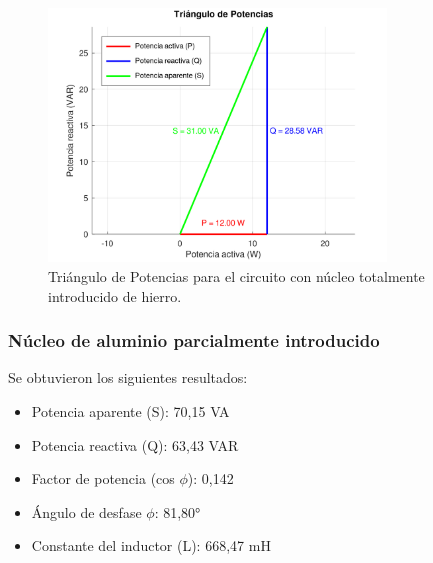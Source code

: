 \documentclass{article}
\begin{document}
                        \begin{figure}[H]
                            \centering
                            \includegraphics[width=0.8\textwidth]{graficoTotalHierro.png}
                            \caption{Triángulo de Potencias para el circuito con núcleo totalmente introducido de hierro.}
                            \label{fig:graficoTotalHierro}
                        \end{figure}


                        \subsubsection{Núcleo de aluminio parcialmente introducido}

                            Se obtuvieron los siguientes resultados:
                        \begin{itemize}
                            \item Potencia aparente (S): 70,15 VA
                            \item Potencia reactiva (Q): 63,43 VAR
                            \item Factor de potencia (cos $\phi$): 0,142
                            \item Ángulo de desfase $\phi$: 81,80°
                            \item Constante del inductor (L): 668,47 mH
                        \end{itemize}

                    
\end{document}

